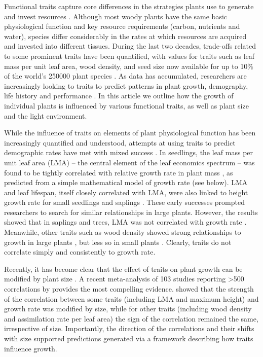 \documentclass[a4paper,11pt]{article}
\begin{document}
Functional traits capture core differences in the strategies plants use to generate and invest resources \citep{Westoby-2002, Wright-2004, Chave-2009}. Although most woody plants have the same basic physiological function and key resource requirements (carbon, nutrients and water), species differ considerably in the rates at which resources are acquired and invested into different tissues. During the last two decades, trade-offs related to some prominent traits have been quantified, with values for traits such as leaf mass per unit leaf area, wood density, and seed size now available for up to 10\% of the world's 250000 plant species \citep{Cornwell-2014}. As data has accumulated, researchers are increasingly looking to traits to predict patterns in plant growth, demography, life history and performance \citep{Poorter-2008, Wright-2010, VanKleunen-2010, Adler-2014}. In this article we outline how the growth of individual plants is influenced by various functional traits, as well as plant size and the light environment.

While the influence of traits on elements of plant physiological function has been increasingly quantified and understood, attempts at using traits to predict demographic rates have met with mixed success \citep{Poorter-2006, Poorter-2008,Wright-2010,Herault-2011,Paine-2015}. In seedlings, the leaf mass per unit leaf area (LMA) -- the central element of the leaf economics spectrum \citep{Wright-2004} -- was found to be tightly correlated with relative growth rate in plant mass \citep{Lambers-1992, Cornelissen-1996, Wright-2000}, as predicted from a simple mathematical model of growth rate (see below). LMA and leaf lifespan, itself closely correlated with LMA, were also linked to height growth rate for small seedlings and saplings \citep{Reich-1992, Poorter-2006}. These early successes prompted researchers to search for similar relationships in large plants. However, the results showed that in saplings and trees, LMA was not correlated with growth rate \citep{Poorter-2008, Wright-2010, Herault-2011, Paine-2015}. Meanwhile, other traits such as wood density showed strong relationships to growth in large plants \citep{Wright-2010,Herault-2011}, but less so in small plants \citep{Castro-1998}. Clearly, traits do not correlate simply and consistently to growth rate.

Recently, it has become clear that the effect of traits on plant growth can be modified by plant size \citep{Falster-2011, Ruger-2012, Iida-2014, Visser-2016, Gibert-2016}. A recent meta-analysis of 103 studies reporting \textgreater 500 correlations by \citet{Gibert-2016} provides the most compelling evidence. \citet{Gibert-2016} showed that the strength of the correlation between some traits (including LMA and maximum height) and growth rate was modified by size, while for other traits (including wood density and assimilation rate per leaf area) the sign of the correlation remained the same, irrespective of size. Importantly, the direction of the correlations and their shifts with size supported predictions generated via a framework describing how traits influence growth.
\end{document}
